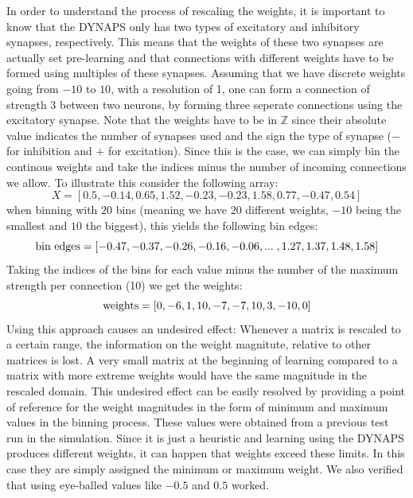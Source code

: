 \documentclass[twoside,11pt]{article}
\begin{document}
In order to understand the process of rescaling the weights, it is important to know that
the DYNAPS only has two types of excitatory and inhibitory synapses, respectively.
This means that the weights of these two synapses are actually set pre-learning
and that connections with different weights have to be formed using multiples of these
synapses.
Assuming that we have discrete weights going from $-10$ to $10$, with a resolution of 1, one
can form a connection of strength 3 between two neurons, by forming three seperate connections
using the excitatory synapse. Note that the weights have to be in $\mathbb{Z}$ since
their absolute value indicates the number of synapses used and the sign the type of
synapse ($-$ for inhibition and $+$ for excitation).
Since this is the case, we can simply bin the continous weights and take the indices minus
the number of incoming connections we allow.
To illustrate this consider the following array:
\begin{equation*}
X = [ 0.5 , -0.14,  0.65,  1.52, -0.23, -0.23,  1.58,  0.77, -0.47, 0.54]
\end{equation*}
when binning with $20$ bins (meaning we have $20$ different weights, $-10$ being the smallest and $10$ the biggest),
this yields the following bin edges:
\begin{equation*}
\textnormal{bin edges} = [-0.47, -0.37, -0.26, -0.16, -0.06,  ... \; ,  1.27, 1.37,  1.48,  1.58]
\end{equation*}
Taking the indices of the bins for each value minus the number of the maximum strength per connection (10)
we get the weights:
\begin{equation*}
\textnormal{weights} = [  0,  -6,   1,  10,  -7,  -7,  10,   3, -10,   0]
\end{equation*}
Using this approach causes an undesired effect: Whenever a matrix is rescaled to a certain range,
the information on the weight magnitute, relative to other matrices is lost. A very small matrix at the
beginning of learning compared to a matrix with more extreme weights would have the same magnitude in
the rescaled domain. This undesired effect can be easily resolved by providing a point of reference for the
weight magnitudes in the form of minimum and maximum values in the binning process. These values were obtained
from a previous test run in the simulation. Since it is just a heuristic and learning using the DYNAPS produces
different weights, it can happen that weights exceed these limits. In this case they are simply assigned the
minimum or maximum weight. We also verified that using eye-balled values like $-0.5$ and $0.5$ worked. \\
\end{document}
